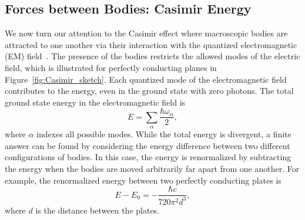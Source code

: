 

\subsection{Forces between Bodies: Casimir Energy}

We now turn our attention to the Casimir effect where macroscopic bodies are attracted to 
one another via their interaction with the quantized electromagnetic (EM) field~\cite{Casimir1948}.  
The presence of the bodies restricts the allowed modes of the electric field, 
which is illustrated for perfectly conducting planes in Figure~\ref{fig:Casimir_sketch}.
Each quantized mode of the electromagnetic field contributes
to the energy, even in the ground state with zero photons.
The total ground state energy in the electromagnetic field is 
\begin{equation}
  E=\sum_\alpha\frac{\hbar\omega_{\alpha}}{2},
\end{equation}
where $\alpha$ indexes all possible modes.  
While the total energy is divergent, a finite answer can be found by considering 
the energy difference between two different configurations of bodies.  
In this case, the energy is renormalized by subtracting the energy when the bodies are moved arbitrarily far apart
from one another.  
For example, the renormalized energy between two perfectly conducting plates is
\begin{equation}
  E-E_0 = -\frac{\hbar c}{720\pi^2 d^3},\label{eq:Casimir_energy}
\end{equation}
where $d$ is the distance between the plates.  %

